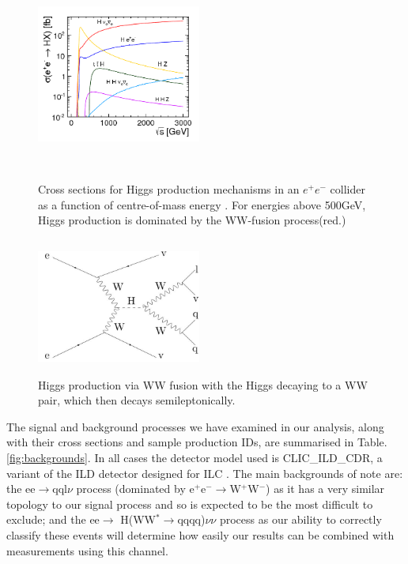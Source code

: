 \begin{figure}
  \centering
  \includegraphics[width=0.48\textwidth,height=7cm,keepaspectratio]{HiggsAnalysis/figures/Midterm_HiggsCrossSections}
  \caption[Higgs Cross Sections]{Cross sections for Higgs production mechanisms in an ${e^+e^-}$ collider as a function of centre-of-mass energy \cite{Simon:2014aqa}. For energies above 500GeV, Higgs production is dominated by the WW-fusion process(red.)}
  \label{fig:HiggsCrossSections}
\end{figure}

\begin{figure}[h]
  \centering
  \includegraphics[width=0.48\textwidth,height=4.5cm,keepaspectratio]{HiggsAnalysis/figures/feynmann}
  \caption[Signal Feynmann Diagram]{Higgs production via WW fusion with the Higgs decaying to a WW pair, which then decays semileptonically.}
  \label{fig:feynmann}
\end{figure}


The signal and background processes we have examined in our analysis, along with their cross sections and sample production IDs, are summarised in Table. \ref{fig:backgrounds}. In all cases the detector model used is CLIC\_ILD\_CDR, a variant of the ILD detector designed for ILC \cite{CDR}. The main backgrounds of note are: the ee$\rightarrow$qql$\nu$ process (dominated by e$^+$e$^-\rightarrow$W$^+$W$^-$) as it has a very similar topology to our signal process and so is expected to be the most difficult to exclude; and the ee$\rightarrow$ H(WW$^*\rightarrow$qqqq)$\nu\nu$ process as our ability to correctly classify these events will determine how easily our results can be combined with measurements using this channel.

